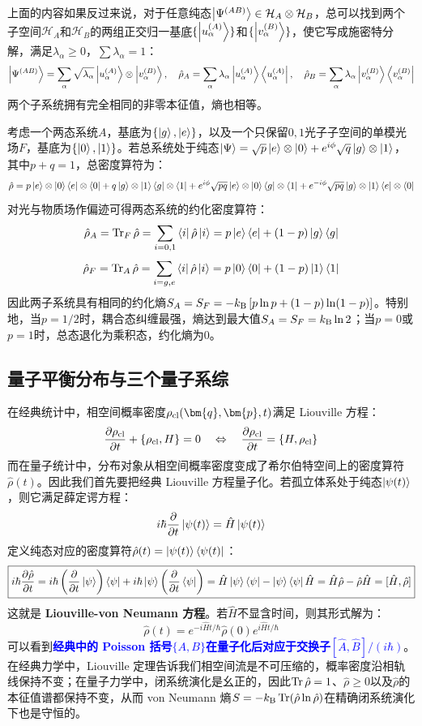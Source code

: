 上面的内容如果反过来说，对于任意纯态$\ket{\Psi^{(AB)}}\in\mathcal{H}_A\otimes\mathcal{H}_B$，总可以找到两个子空间$\mathcal{H}_A$和$\mathcal{H}_B$的两组正交归一基底$\{\ket{u_{\alpha}^{(A)}}\}$和$\{\ket{v_{\alpha}^{(B)}}\}$，使它写成施密特分解，满足$\lambda_{\alpha}\ge 0$，$\sum\lambda_{\alpha}=1$：
\[\ket{\Psi^{(AB)}}=\sum_{\alpha}\sqrt{\lambda_{\alpha}}\ket{u_{\alpha}^{(A)}}\otimes\ket{v_{\alpha}^{(B)}}, \quad \hat{\rho}_A=\sum_{\alpha}\lambda_{\alpha}\ket{u_{\alpha}^{(A)}}\bra{u_{\alpha}^{(A)}}, \quad \hat{\rho}_B=\sum_{\alpha}\lambda_{\alpha}\ket{v_{\alpha}^{(B)}}\bra{v_{\alpha}^{(B)}}\]
两个子系统拥有完全相同的非零本征值，熵也相等。

\begin{proposition}[两态系统与单模光场的耦合]
考虑一个两态系统$A$，基底为$\{\ket{g},\ket{e}\}$，以及一个只保留$0,1$光子子空间的单模光场$F$，基底为$\{\ket{0},\ket{1}\}$。若总系统处于纯态$\ket{\Psi}=\sqrt{p}\ket{e}\otimes\ket{0}+e^{i\phi}\sqrt{q}\ket{g}\otimes\ket{1}$，其中$p+q=1$，总密度算符为：
\[\hat{\rho}=p\ket{e}\otimes\ket{0}\bra{e}\otimes\bra{0}+q\ket{g}\otimes\ket{1}\bra{g}\otimes\bra{1}+e^{i\phi}\sqrt{pq}\ket{e}\otimes\ket{0}\bra{g}\otimes\bra{1}+e^{-i\phi}\sqrt{pq}\ket{g}\otimes\ket{1}\bra{e}\otimes\bra{0}\]
对光与物质场作偏迹可得两态系统的约化密度算符：
\[\hat{\rho}_A=\Tr_F\hat{\rho}=\sum_{i=0,1}\bra{i}\hat{\rho}\ket{i}=p\ket{e}\bra{e}+(1-p)\ket{g}\bra{g}\]
\[\hat{\rho}_F=\Tr_A\hat{\rho}=\sum_{i=g,e}\bra{i}\hat{\rho}\ket{i}=p\ket{0}\bra{0}+(1-p)\ket{1}\bra{1}\]
因此两子系统具有相同的约化熵$S_A=S_F=-k_{\rm B}\left[p\ln p+(1-p)\ln(1-p)\right]$。特别地，当$p=1/2$时，耦合态纠缠最强，熵达到最大值$S_A=S_F=k_{\rm B}\ln 2$；当$p=0$或$p=1$时，总态退化为乘积态，约化熵为$0$。
\end{proposition}

\newpage
\subsection{量子平衡分布与三个量子系综}
在经典统计中，相空间概率密度$\rho_{\rm cl}(\bm{q},\bm{p},t)$满足 Liouville 方程：
\[\pdv{\rho_{\rm cl}}{t}+\{\rho_{\rm cl},H\}=0 \quad \Leftrightarrow \quad \pdv{\rho_{\rm cl}}{t}=\{H,\rho_{\rm cl}\}\]
而在量子统计中，分布对象从相空间概率密度变成了希尔伯特空间上的密度算符$\hat{\rho}(t)$。因此我们首先要把经典 Liouville 方程量子化。若孤立体系处于纯态$\ket{\psi(t)}$，则它满足薛定谔方程：
\[i\hbar \pdv{}{t}\ket{\psi(t)}=\hat{H}\ket{\psi(t)}\]
定义纯态对应的密度算符$\hat{\rho}(t)=\ket{\psi(t)}\bra{\psi(t)}$：
\[\boxed{i\hbar \pdv{\hat{\rho}}{t}=i\hbar \left(\pdv{}{t}\ket{\psi}\right)\bra{\psi}+i\hbar \ket{\psi}\left(\pdv{}{t}\bra{\psi}\right)=\hat{H}\ket{\psi}\bra{\psi}-\ket{\psi}\bra{\psi}\hat{H}=\hat{H}\hat{\rho}-\hat{\rho}\hat{H}=[\hat{H},\hat{\rho}]}\]
这就是 \textbf{Liouville-von Neumann 方程}。若$\hat{H}$不显含时间，则其形式解为：
\[\hat{\rho}(t)=e^{-i\hat{H}t/\hbar}\hat{\rho}(0)e^{i\hat{H}t/\hbar}\]
可以看到\textcolor{blue}{\textbf{经典中的 Poisson 括号$\{A,B\}$在量子化后对应于交换子$[\hat{A},\hat{B}]/(i\hbar)$}}。在经典力学中，Liouville 定理告诉我们相空间流是不可压缩的，概率密度沿相轨线保持不变；在量子力学中，闭系统演化是幺正的，因此$\Tr\hat{\rho}=1$、$\hat{\rho}\ge 0$以及$\hat{\rho}$的本征值谱都保持不变，从而 von Neumann 熵$S=-k_{\rm B}\Tr(\hat{\rho}\ln\hat{\rho})$在精确闭系统演化下也是守恒的。

